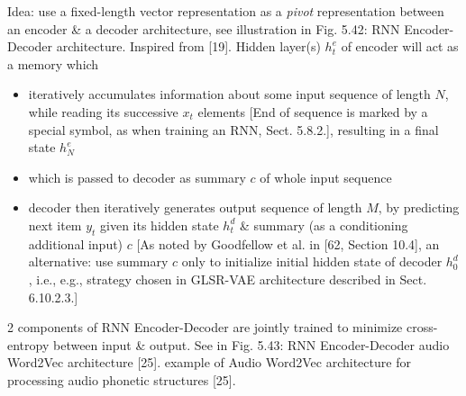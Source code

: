 \documentclass{article}
\begin{document}
\begin{itemize}
\begin{itemize}
\begin{itemize}
			Idea: use a fixed-length vector representation as a {\it pivot} representation between an encoder \& a decoder architecture, see illustration in {\sf Fig. 5.42: RNN Encoder-Decoder architecture. Inspired from [19]}. Hidden layer(s) $h_t^e$ of encoder will act as a memory which
			\begin{itemize}
				\item iteratively accumulates information about some input sequence of length $N$, while reading its successive $x_t$ elements [End of sequence is marked by a special symbol, as when training an RNN, Sect. 5.8.2.], resulting in a final state $h_N^e$
				\item which is passed to decoder as summary $c$ of whole input sequence
				\item decoder then iteratively generates output sequence of length $M$, by predicting next item $y_t$ given its hidden state $h_t^d$ \& summary (as a conditioning additional input) $c$ [As noted by Goodfellow et al. in [62, Section 10.4], an alternative: use summary $c$ only to initialize initial hidden state of decoder $h_0^d$, i.e., e.g., strategy chosen in GLSR-VAE architecture described in Sect. 6.10.2.3.]
			\end{itemize}
			2 components of RNN Encoder-Decoder are jointly trained to minimize cross-entropy between input \& output. See in {\sf Fig. 5.43: RNN Encoder-Decoder audio Word2Vec architecture [25].} example of Audio Word2Vec architecture for processing audio phonetic structures [25].


\end{itemize}
\end{itemize}
\end{itemize}
\end{document}
